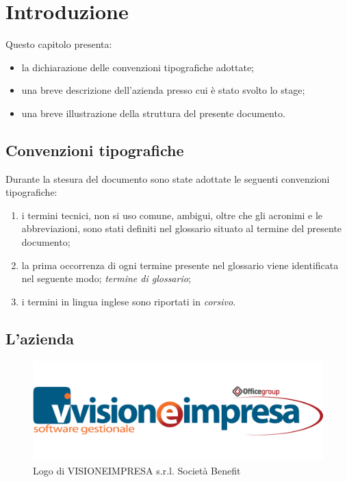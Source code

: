 \chapter{Introduzione}
\label{cap:introduzione}

Questo capitolo presenta:
\begin{itemize}
    \item la dichiarazione delle convenzioni tipografiche adottate;
    \item una breve descrizione dell'azienda presso cui è stato svolto lo stage;
    \item una breve illustrazione della struttura del presente documento.
\end{itemize}

\section{Convenzioni tipografiche}

Durante la stesura del documento sono state adottate le seguenti convenzioni tipografiche:
\begin{enumerate}
    \item i termini tecnici, non si uso comune, ambigui, oltre che gli acronimi e le abbreviazioni, sono stati definiti nel glossario situato al termine del presente documento;
    \item la prima occorrenza di ogni termine presente nel glossario viene identificata nel seguente modo; \emph{termine di glossario}\glsfirstoccur;
    \item i termini in lingua inglese sono riportati in \textit{corsivo}.
\end{enumerate}

\section{L'azienda}

\begin{figure}[!h]
    \centering 
    \includegraphics[width=0.7\columnwidth]{images/logo-visioneimpresa.png} 
    \caption{Logo di VISIONEIMPRESA s.r.l. Società Benefit}
\end{figure}

